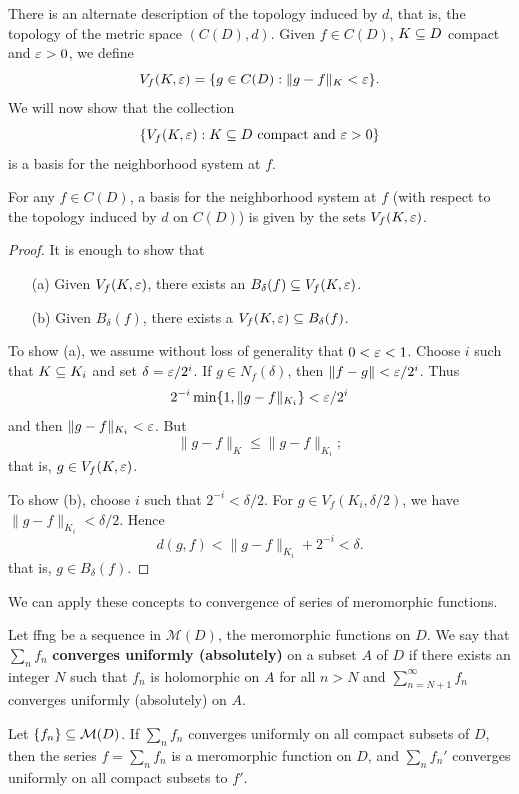 There is an alternate description of the topology induced by $d$, that is, the topology of the metric space $(C(D),d)$. Given $f\in C(D)$, $K\subseteq D$ compact and $\varepsilon>0$, we define
\[V_f(K,\varepsilon)=\{g\in C(D):\|g-f\|_{K}<\varepsilon\}.\]
We will now show that the collection
\[\{V_f(K,\varepsilon):K\subseteq D\text{ compact and }\varepsilon>0\}\]
is a basis for the neighborhood system at $f$.
\begin{theorem}\label{basis for C(D)}
For any $f\in C(D)$, a basis for the neighborhood system at $f$ (with respect to the topology induced by $d$ on $C(D)$) is given by the sets $V_f(K,\varepsilon)$.
\end{theorem}
\begin{proof}
It is enough to show that
\begin{itemize}
\item[(a)] Given $V_{f}(K,\varepsilon)$, there exists an $B_{\delta}(f)\subseteq V_f(K,\varepsilon)$.
\item[(b)] Given $B_\delta(f)$, there exists a $V_f(K,\varepsilon)\subseteq B_\delta(f)$. 
\end{itemize}
To show (a), we assume without loss of generality that $0<\varepsilon<1$. Choose $i$ such that $K\subseteq K_i$ and set $\delta=\varepsilon/2^i$. If $g\in N_f(\delta)$, then $\|f-g\|<\varepsilon/2^i$. Thus
\[2^{-i}\min\{1,\|g-f\|_{K_i}\}<\varepsilon/2^i\]
and then $\|g-f\|_{K_i}<\varepsilon$. But
\[\|g-f\|_K\leq\|g-f\|_{K_i};\]
that is, $g\in V_f(K,\varepsilon)$.\par
To show (b), choose $i$ such that $2^{-i}<\delta/2$. For $g\in V_f(K_i,\delta/2)$, we have $\|g-f\|_{K_i}<\delta/2$. Hence
\[d(g,f)<\|g-f\|_{K_i}+2^{-i}<\delta.\]
that is, $g\in B_{\delta}(f)$.
\end{proof}
We can apply these concepts to convergence of series of meromorphic functions.
\begin{definition}
Let ffng be a sequence in $\mathcal{M}(D)$, the meromorphic functions on $D$. We say that $\sum_nf_n$ \textbf{converges uniformly (absolutely)} on a subset $A$ of $D$ if there exists an integer $N$ such that $f_n$ is holomorphic on $A$ for all $n>N$ and $\sum_{n=N+1}^{\infty}f_n$ converges uniformly (absolutely) on $A$.
\end{definition}
\begin{proposition}
Let $\{f_n\}\subseteq\mathcal{M}(D)$. If $\sum_nf_n$ converges uniformly on all compact subsets of $D$, then the series $f=\sum_nf_n$ is a meromorphic function on $D$, and $\sum_nf_n'$ converges uniformly on all compact subsets to $f'$.
\end{proposition}
